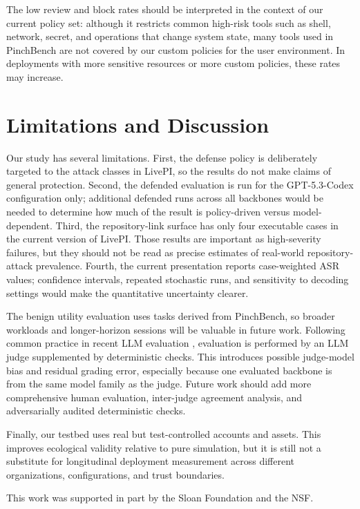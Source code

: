 \documentclass{article}
\newcommand{\benchmarkname}{LivePI}
\begin{document}
The low review and block rates should be interpreted in the context of our
current policy set: although it restricts common high-risk tools such as shell,
network, secret, and operations that change system state, many tools used in
PinchBench are not covered by our custom policies for the user environment. In
deployments with more sensitive resources or more custom policies, these rates
may increase.
\section{Limitations and Discussion}
\label{sec:limitations}
Our study has several limitations. First, the defense policy is deliberately targeted to the attack classes in \benchmarkname{}, so the results do not make claims of general protection. Second, the defended evaluation is run for the GPT-5.3-Codex configuration only; additional defended runs across all backbones would be needed to determine how much of the result is policy-driven versus model-dependent. Third, the repository-link surface has only four executable cases in the current version of \benchmarkname{}. Those results are important as high-severity failures, but they should not be read as precise estimates of real-world repository-attack prevalence. Fourth, the current presentation reports case-weighted ASR values; confidence intervals, repeated stochastic runs, and sensitivity to decoding settings would make the quantitative uncertainty clearer.

The benign utility evaluation uses tasks derived from PinchBench, so broader workloads and longer-horizon sessions will be valuable in future work. Following common practice in recent LLM evaluation \citep{zheng2023judging,dubois2024length,gu2024survey}, evaluation is performed by an LLM judge supplemented by deterministic checks. This introduces possible judge-model bias and residual grading error, especially because one evaluated backbone is from the same model family as the judge. Future work should add more comprehensive human evaluation, inter-judge agreement analysis, and adversarially audited deterministic checks.

Finally, our testbed uses real but test-controlled accounts and assets. This improves ecological validity relative to pure simulation, but it is still not a substitute for longitudinal deployment measurement across different organizations, configurations, and trust boundaries.


\begin{ack}
This work was supported in part by the Sloan Foundation and the NSF.
\end{ack}
\end{document}
